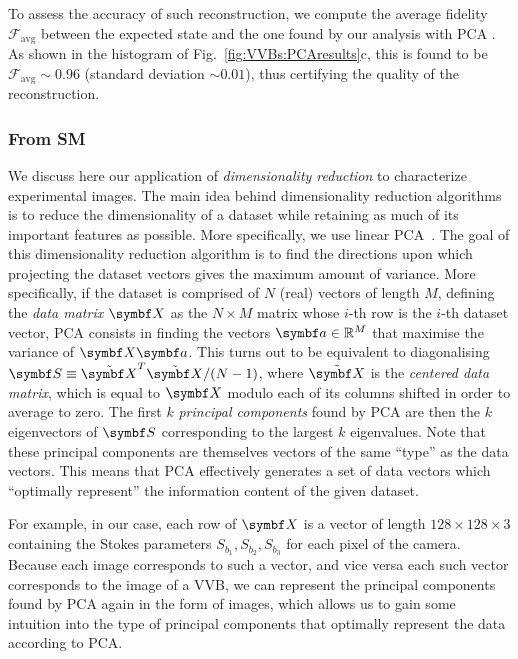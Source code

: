To assess the accuracy of such reconstruction, we compute the average fidelity $\mathcal F_{\text{avg}}$ between the expected state and the one found by our analysis with PCA . As shown in the histogram of Fig.~\ref{fig:VVBs:PCAresults}c,  this is found to be $\mathcal F_{\text{avg}}\sim0.96$ (standard deviation $\sim0.01$), thus certifying the quality of the reconstruction.

\subsubsection{From SM}

We discuss here our application of \emph{dimensionality reduction} to characterize experimental images. The main idea behind dimensionality reduction algorithms is to reduce the dimensionality of a dataset while retaining as much of its important features as possible. More specifically, we use linear \ac{PCA}~\cite{jolliffe2016principal}. The goal of this dimensionality reduction algorithm is to find the directions upon which projecting the dataset vectors gives the maximum amount of variance. More specifically, if the dataset is comprised of $N$ (real) vectors of length $M$, defining the \emph{data matrix} $\bs X$ as the $N\times M$ matrix whose $i$-th row is the $i$-th dataset vector, \ac{PCA} consists in finding the vectors $\bs a\in\RR^{M}$ that maximise the variance of $\bs X\bs a$. This turns out to be equivalent to diagonalising $\bs S\equiv \tilde{\bs X}^T\tilde{\bs X}/(N-1)$, where $\tilde{\bs X}$ is the \emph{centered data matrix}, which is equal to $\bs X$ modulo each of its columns shifted in order to average to zero.
The first $k$ \emph{principal components} found by \ac{PCA} are then the $k$ eigenvectors of $\bs S$ corresponding to the largest $k$ eigenvalues.
Note that these principal components are themselves vectors of the same ``type'' as the data vectors. This means that \ac{PCA} effectively generates a set of data vectors which ``optimally represent'' the information content of the given dataset.

For example, in our case, each row of $\bs X$ is a vector of length $128\times128\times3$ containing the Stokes parameters $S_{b_1}, S_{b_2}, S_{b_3}$ for each pixel of the camera.
Because each image corresponds to such a vector, and vice versa each such vector corresponds to the image of a \ac{VVB}, we can represent the principal components found by \ac{PCA} again in the form of images, which allows us to gain some intuition into the type of principal components that optimally represent the data according to \ac{PCA}.

